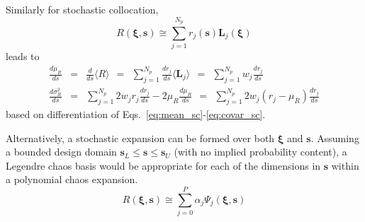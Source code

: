 Similarly for stochastic collocation,
\begin{equation}
R(\boldsymbol{\xi}, \boldsymbol{s}) \cong \sum_{j=1}^{N_p} r_j(\boldsymbol{s}) 
\boldsymbol{L}_j(\boldsymbol{\xi}) \label{eq:R_r_s_L_xi}
\end{equation}
leads to
\begin{eqnarray}
\frac{d\mu_R}{ds} &=& \frac{d}{ds} \langle R \rangle 
~~=~~ \sum_{j=1}^{N_p} \frac{dr_j}{ds} \langle \boldsymbol{L}_j \rangle 
~~=~~ \sum_{j=1}^{N_p} w_j \frac{dr_j}{ds} \label{eq:dmuR_ds_xi_sc} \\
\frac{d\sigma^2_R}{ds} &=& \sum_{j=1}^{N_p} 2 w_j r_j \frac{dr_j}{ds}
- 2 \mu_R \frac{d\mu_R}{ds} 
~~=~~ \sum_{j=1}^{N_p} 2 w_j (r_j - \mu_R) \frac{dr_j}{ds}
\label{eq:dsigR_ds_xi_sc}
\end{eqnarray}
based on differentiation of Eqs.~\ref{eq:mean_sc}-\ref{eq:covar_sc}.

Alternatively, a stochastic expansion can be formed over both
$\boldsymbol{\xi}$ and $\boldsymbol{s}$.  Assuming a bounded
design domain $\boldsymbol{s}_L \le \boldsymbol{s} \le
\boldsymbol{s}_U$ (with no implied probability content), a Legendre 
chaos basis would be appropriate for each of the dimensions in 
$\boldsymbol{s}$ within a polynomial chaos expansion.
\begin{equation}
R(\boldsymbol{\xi}, \boldsymbol{s}) \cong \sum_{j=0}^P \alpha_j 
\Psi_j(\boldsymbol{\xi}, \boldsymbol{s}) \label{eq:R_alpha_psi_xi_s}
\end{equation}

